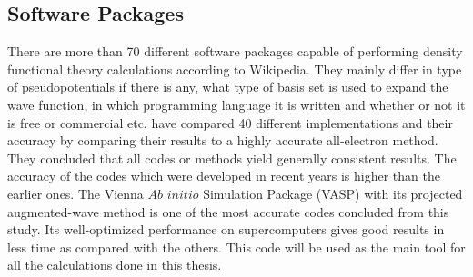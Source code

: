\subsection{Software Packages}
There are more than 70 different software packages capable of performing density functional theory calculations according to Wikipedia\cite{dft_sws}. They mainly differ in type of pseudopotentials if there is any, what type of basis set is used to expand the wave function, in which programming language it is written and whether or not it is free or commercial etc. \citet{Lejaeghereaad3000} have compared 40 different implementations and their accuracy by comparing their results to a highly accurate all-electron method. They concluded that all codes or methods yield generally consistent results. The accuracy of the codes which were developed in recent years is higher than the earlier ones. The Vienna $Ab$ $initio$ Simulation Package (VASP) \cite{VASP1,VASP2} with its projected augmented-wave method is one of the most accurate codes concluded from this study. Its well-optimized performance on supercomputers gives good results in less time as compared with the others. This code will be used as the main tool for all the calculations done in this thesis.